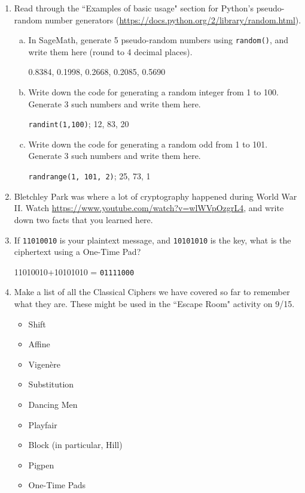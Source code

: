 \documentclass[12pt]{amsart}
\theoremstyle{plain}
\theoremstyle{definition}
\begin{document}
\begin{enumerate}[1.]
	\item Read through the ``Examples of basic usage" section for Python's pseudo-random number generators (\url{https://docs.python.org/2/library/random.html}).
	\begin{enumerate}[a.]
		\item In SageMath, generate 5 pseudo-random numbers using \texttt{random()}, and write them here (round to 4 decimal places).
			\begin{framed}
			0.8384, 0.1998, 0.2668, 0.2085, 0.5690
			\end{framed}
		\item Write down the code for generating a random integer from 1 to 100.  Generate 3 such numbers and write them here.
			\begin{framed}
			\texttt{randint(1,100)}; 12, 83, 20
			\end{framed}
		 \item Write down the code for generating a random odd from 1 to 101.  Generate 3 such numbers and write them here.
			\begin{framed}
			\texttt{randrange(1, 101, 2)}; 25, 73, 1
			\end{framed}
	\end{enumerate}
	\item Bletchley Park was where a lot of cryptography happened during World War II.  Watch \url{https://www.youtube.com/watch?v=wlWVpOzgrL4}, and write down two facts that you learned here.
	\begin{framed}
	\vspace{3in}
	\end{framed}
	\item If \texttt{11010010} is your plaintext message, and \texttt{10101010} is the key, what is the ciphertext using a One-Time Pad? 
	\begin{framed}
	11010010+10101010 = \texttt{01111000}
	\end{framed}
	 \item Make a list of all the Classical Ciphers we have covered so far to remember what they are.  These might be used in the ``Escape Room" activity on 9/15.
	\begin{framed}
	\begin{itemize}
		\item Shift
		\item Affine
		\item Vigen\`{e}re
		\item Substitution
		\item Dancing Men
		\item Playfair
		\item Block (in particular, Hill)
		\item Pigpen
		\item One-Time Pads
	\end{itemize}
	\end{framed}
\end{enumerate}

	
\end{document}
